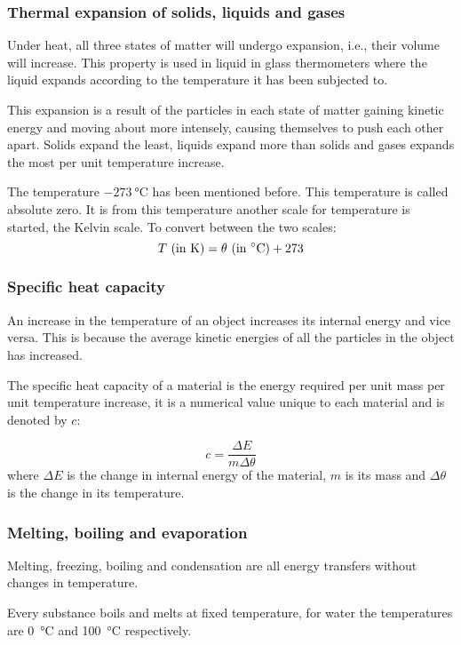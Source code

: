 \subsubsection{Thermal expansion of solids, liquids and gases}

Under heat, all three states of matter will undergo expansion, i.e., their volume will increase.
This property is used in liquid in glass thermometers where the liquid expands according to the
temperature it has been subjected to.

This expansion is a result of the particles in each state of matter gaining kinetic energy and
moving about more intensely, causing themselves to push each other apart. Solids expand the
least, liquids expand more than solids and gases expands the most per unit temperature increase.

The temperature $\SI{-273}{\celsius}$ has been mentioned before. This temperature is called
absolute zero. It is from this temperature another scale for temperature is started, the Kelvin
scale. To convert between the two scales:
$$ T \textrm{ (in K)} = \theta \textrm{ (in \SI{}{\celsius})} + 273 $$

\subsubsection{Specific heat capacity}

An increase in the temperature of an object increases its internal energy and vice versa. This is
because the average kinetic energies of all the particles in the object has increased.

The specific heat capacity of a material is the energy required per unit mass per unit temperature
increase, it is a numerical value unique to each material and is denoted by $c$:

$$ c = \frac{\Delta E}{m \Delta \theta} $$
where $\Delta E$ is the change in internal energy of the material, $m$ is its mass and $\Delta \theta$
is the change in its temperature.

\subsubsection{Melting, boiling and evaporation}

Melting, freezing, boiling and condensation are all energy transfers without changes in temperature.

Every substance boils and melts at fixed temperature, for water the temperatures are \SI{0}{\celsius}
and \SI{100}{\celsius} respectively.

